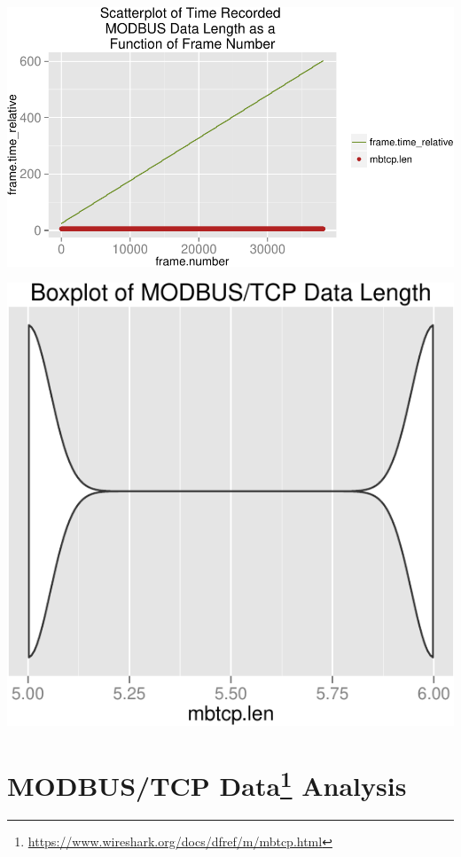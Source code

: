 \documentclass[]{article}
\let\rmarkdownfootnote\footnote%
\def\footnote{\protect\rmarkdownfootnote}
\begin{document}
\pagebreak

\includegraphics{sew_files/figure-latex/unnamed-chunk-19-1.pdf}

\begin{center}\includegraphics{sew_files/figure-latex/unnamed-chunk-20-1} \end{center}

\pagebreak

\section[MODBUS/TCP Data Analysis]{MODBUS/TCP Data\footnote{\url{https://www.wireshark.org/docs/dfref/m/mbtcp.html}}
Analysis}\label{modbustcp-data1-analysis}
\end{document}
